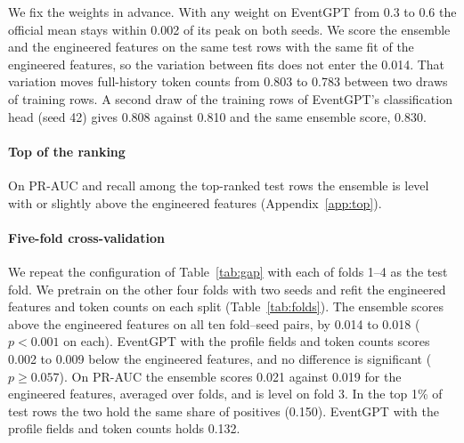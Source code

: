 \documentclass[12pt]{article}
\begin{document}
We fix the weights in advance. With any weight on EventGPT from 0.3 to 0.6 the official mean stays within 0.002 of its peak on both seeds. We score the ensemble and the engineered features on the same test rows with the same fit of the engineered features, so the variation between fits does not enter the 0.014. That variation moves full-history token counts from 0.803 to 0.783 between two draws of training rows. A second draw of the training rows of EventGPT's classification head (seed 42) gives 0.808 against 0.810 and the same ensemble score, 0.830.

\paragraph{Top of the ranking} On PR-AUC and recall among the top-ranked test rows the ensemble is level with or slightly above the engineered features (Appendix~\ref{app:top}).

\paragraph{Five-fold cross-validation} We repeat the configuration of Table~\ref{tab:gap} with each of folds 1--4 as the test fold. We pretrain on the other four folds with two seeds and refit the engineered features and token counts on each split (Table~\ref{tab:folds}). The ensemble scores above the engineered features on all ten fold--seed pairs, by 0.014 to 0.018 ($p < 0.001$ on each). EventGPT with the profile fields and token counts scores 0.002 to 0.009 below the engineered features, and no difference is significant ($p \geq 0.057$). On PR-AUC the ensemble scores 0.021 against 0.019 for the engineered features, averaged over folds, and is level on fold 3. In the top 1\% of test rows the two hold the same share of positives (0.150). EventGPT with the profile fields and token counts holds 0.132.
\end{document}
